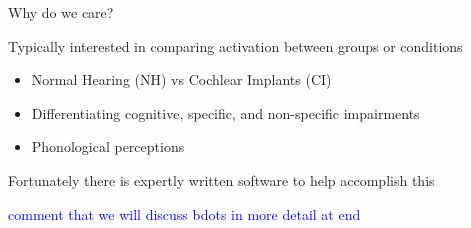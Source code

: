 \documentclass{beamer}
\providecommand{\cn}[1]{\textcolor{blue}{#1}}
\begin{document}
\begin{frame}{Why do we care?}

Typically interested in comparing activation between groups or conditions \vspace{2mm}

\begin{itemize}
\item Normal Hearing (NH) vs Cochlear Implants (CI) \vspace{2mm}
\item Differentiating cognitive, specific, and non-specific impairments \vspace{2mm}
\item Phonological perceptions \vspace{2mm}
\end{itemize}

Fortunately there is expertly written software to help accomplish this

\cn{comment that we will discuss bdots in  more detail at end}

\end{frame}
\end{document}
